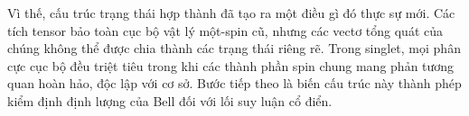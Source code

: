 Vì thế, cấu trúc trạng thái hợp thành đã tạo ra một điều gì đó thực sự mới. Các tích tensor bảo toàn cục bộ vật lý một-spin cũ, nhưng các vectơ tổng quát của chúng không thể được chia thành các trạng thái riêng rẽ. Trong singlet, mọi phân cực cục bộ đều triệt tiêu trong khi các thành phần spin chung mang phản tương quan hoàn hảo, độc lập với cơ sở. Bước tiếp theo là biến cấu trúc này thành phép kiểm định định lượng của Bell đối với lối suy luận cổ điển.

